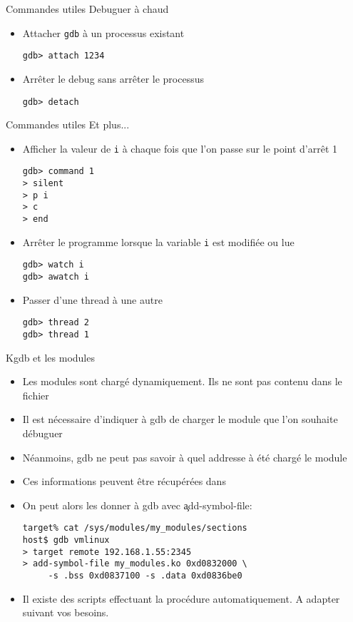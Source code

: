 \begin{frame}[fragile=singleslide]{Commandes utiles}
  Debuguer à chaud
  \begin{itemize}
  \item Attacher \verb+gdb+ à un processus existant
    \begin{lstlisting}
gdb> attach 1234
    \end{lstlisting}
  \item Arrêter le debug sans arrêter le processus
    \begin{lstlisting}
gdb> detach
     \end{lstlisting}
   \end{itemize}
\end{frame}

\begin{frame}[fragile=singleslide]{Commandes utiles}
  Et plus...
  \begin{itemize}
  \item Afficher  la valeur de \verb+i+  à chaque fois  que l'on passe
    sur le point d'arrêt 1
    \begin{lstlisting}
gdb> command 1
> silent
> p i
> c
> end
    \end{lstlisting}
  \item Arrêter le programme lorsque la variable \verb+i+ est modifiée
    ou lue
    \begin{lstlisting}
gdb> watch i
gdb> awatch i
      \end{lstlisting}
    \item Passer d'une thread à une autre
      \begin{lstlisting}
gdb> thread 2
gdb> thread 1
      \end{lstlisting}
    \end{itemize}
\end{frame}

\begin{frame}[fragile=singleslide]{Kgdb et les modules}
  \begin{itemize} 
  \item Les modules sont chargé dynamiquement. Ils ne sont pas contenu
    dans le fichier 
  \item Il  est nécessaire d'indiquer à  gdb de charger  le module que
    l'on souhaite débuguer
  \item Néanmoins, gdb ne peut pas savoir à quel addresse à été chargé
    le module
  \item    Ces    informations    peuvent   être    récupérées    dans
  \item On peut alors les donner à gdb avec \c{add-symbol-file}:
    \begin{lstlisting} 
target% cat /sys/modules/my_modules/sections
host$ gdb vmlinux
> target remote 192.168.1.55:2345
> add-symbol-file my_modules.ko 0xd0832000 \
     -s .bss 0xd0837100 -s .data 0xd0836be0
    \end{lstlisting} 
  \item    Il   existe   des    scripts   effectuant    la   procédure
    automatiquement. A adapter suivant vos besoins.
  \end{itemize}
\end{frame} 

